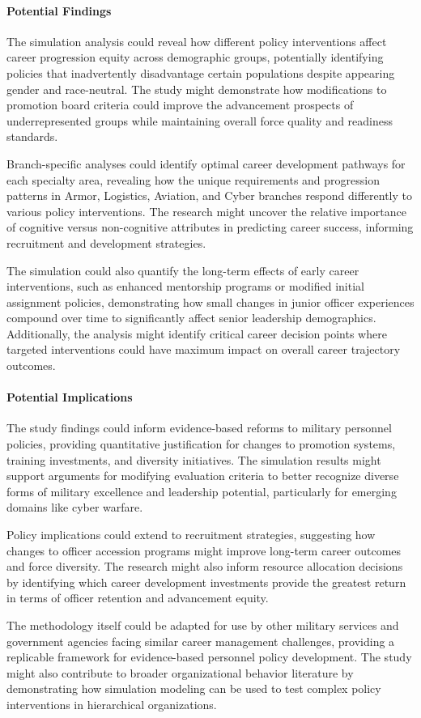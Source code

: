 \documentclass[main.tex]{subfiles}
\begin{document}
\paragraph{Potential Findings}

The simulation analysis could reveal how different policy interventions affect career progression equity across demographic groups, potentially identifying policies that inadvertently disadvantage certain populations despite appearing gender and race-neutral\autocite{bullinaria2018}. The study might demonstrate how modifications to promotion board criteria could improve the advancement prospects of underrepresented groups while maintaining overall force quality and readiness standards.

Branch-specific analyses could identify optimal career development pathways for each specialty area, revealing how the unique requirements and progression patterns in Armor, Logistics, Aviation, and Cyber branches respond differently to various policy interventions. The research might uncover the relative importance of cognitive versus non-cognitive attributes in predicting career success, informing recruitment and development strategies.

The simulation could also quantify the long-term effects of early career interventions, such as enhanced mentorship programs or modified initial assignment policies, demonstrating how small changes in junior officer experiences compound over time to significantly affect senior leadership demographics. Additionally, the analysis might identify critical career decision points where targeted interventions could have maximum impact on overall career trajectory outcomes.

\paragraph{Potential Implications}

The study findings could inform evidence-based reforms to military personnel policies, providing quantitative justification for changes to promotion systems, training investments, and diversity initiatives. The simulation results might support arguments for modifying evaluation criteria to better recognize diverse forms of military excellence and leadership potential, particularly for emerging domains like cyber warfare.

Policy implications could extend to recruitment strategies, suggesting how changes to officer accession programs might improve long-term career outcomes and force diversity. The research might also inform resource allocation decisions by identifying which career development investments provide the greatest return in terms of officer retention and advancement equity.

The methodology itself could be adapted for use by other military services and government agencies facing similar career management challenges, providing a replicable framework for evidence-based personnel policy development. The study might also contribute to broader organizational behavior literature by demonstrating how simulation modeling can be used to test complex policy interventions in hierarchical organizations.

\end{document}
